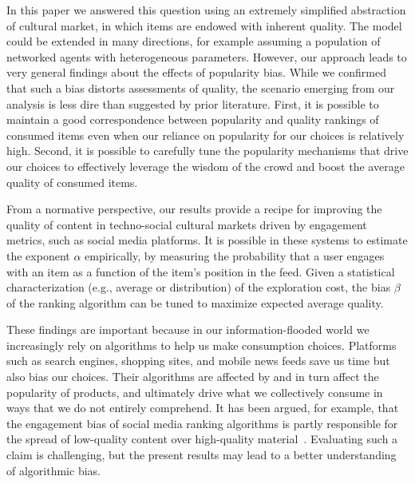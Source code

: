 In this paper we answered this question using an extremely simplified abstraction of cultural market, in which items are endowed with inherent quality. The model could be extended in many directions, for example assuming a population of networked agents with heterogeneous parameters. However, our approach leads to very general findings about the effects of popularity bias. 
While we confirmed that such a bias distorts assessments of quality, the scenario emerging from our analysis is less dire than suggested by prior literature. First, it is possible to maintain a good correspondence between popularity and quality rankings of consumed items even when our reliance on popularity for our choices is relatively high. Second, it is possible to carefully tune the popularity mechanisms that drive our choices to effectively leverage the wisdom of the crowd and boost the average quality of consumed items. 

From a normative perspective, our results provide a recipe for improving the quality of content in techno-social cultural markets driven by engagement metrics, such as social media platforms. It is possible in these systems to estimate the exponent $\alpha$ empirically, by measuring the probability that a user engages with an item as a function of the item's position in the feed. Given a statistical characterization (e.g., average or distribution) of the exploration cost, the bias $\beta$ of the ranking algorithm can be tuned to maximize expected average quality.

These findings are important because in our information-flooded world we increasingly rely on algorithms to help us make consumption choices. Platforms such as search engines, shopping sites, and mobile news feeds save us time but also bias our choices. Their algorithms are affected by and in turn affect the popularity of products, and ultimately drive what we collectively consume in ways that we do not entirely comprehend. It has been argued, for example, that the engagement bias of social media ranking algorithms is partly responsible for the spread of low-quality content over high-quality material~\cite{TowReport2017}. Evaluating such a claim is challenging, but the present results may lead to a better understanding of algorithmic bias. 

